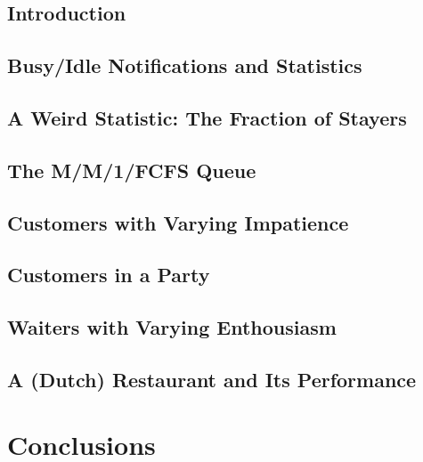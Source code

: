 \documentclass[12pt]{book}
\begin{document}
\section{Introduction}

\section{Busy/Idle Notifications and Statistics}

\section{A Weird Statistic: The Fraction of Stayers}

\section{The M/M/1/FCFS Queue}

\section{Customers with Varying Impatience}

\section{Customers in a Party}

\section{Waiters with Varying Enthousiasm}

\section{A (Dutch) Restaurant and Its Performance}

\chapter{Conclusions}
\label{chap:conclusions}
\end{document}
